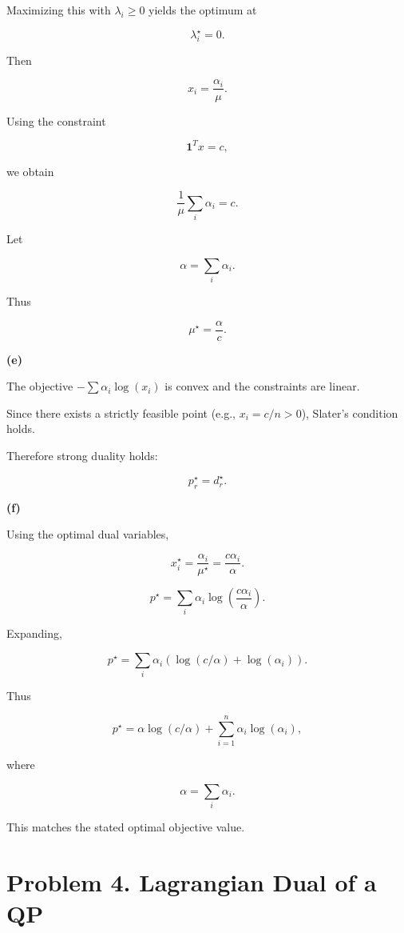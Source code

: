 \documentclass[
	12pt,
]{fphw}
\begin{document}
Maximizing this with $\lambda_i \ge 0$ yields the optimum at

\[
\lambda_i^\star = 0.
\]

Then

\[
x_i = \frac{\alpha_i}{\mu}.
\]

Using the constraint

\[
\mathbf{1}^T x = c,
\]

we obtain

\[
\frac{1}{\mu}\sum_i \alpha_i = c.
\]

Let

\[
\alpha = \sum_i \alpha_i.
\]

Thus

\[
\mu^\star = \frac{\alpha}{c}.
\]

\bigskip

\textbf{(e)}

The objective $-\sum \alpha_i\log(x_i)$ is convex and the constraints are linear.

Since there exists a strictly feasible point (e.g., $x_i = c/n >0$), Slater's condition holds.

Therefore strong duality holds:

\[
p_r^\star = d_r^\star.
\]

\bigskip

\textbf{(f)}

Using the optimal dual variables,

\[
x_i^\star = \frac{\alpha_i}{\mu^\star}
= \frac{c\alpha_i}{\alpha}.
\]

\[
p^\star
=
\sum_i \alpha_i
\log\!\left(\frac{c\alpha_i}{\alpha}\right).
\]

Expanding,

\[
p^\star
=
\sum_i \alpha_i
\left(
\log(c/\alpha) + \log(\alpha_i)
\right).
\]

Thus

\[
p^\star
=
\alpha\log(c/\alpha)
+
\sum_{i=1}^n \alpha_i\log(\alpha_i),
\]

where

\[
\alpha = \sum_i \alpha_i.
\]

This matches the stated optimal objective value.

\newpage
\section*{Problem 4. Lagrangian Dual of a QP}
\end{document}
